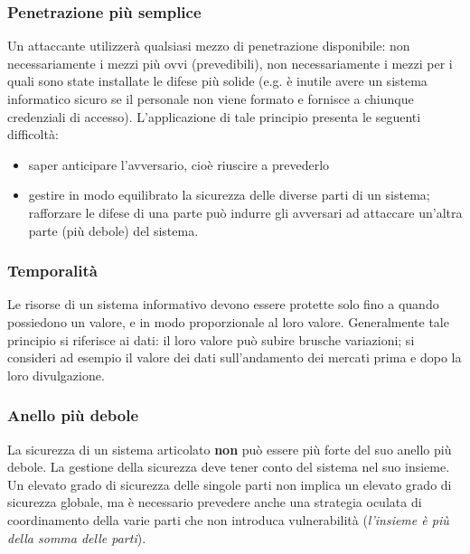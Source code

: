 \subsubsection{Penetrazione più semplice} 
Un attaccante utilizzerà qualsiasi mezzo di penetrazione disponibile: non necessariamente i mezzi più ovvi (prevedibili), non necessariamente i mezzi per i quali sono state installate le difese più solide (e.g. è inutile avere un sistema informatico sicuro se il personale non viene formato e fornisce a chiunque credenziali di accesso). L'applicazione di tale principio presenta le seguenti difficoltà:
\begin{itemize} 
  \item saper anticipare l'avversario, cioè riuscire a prevederlo
  \item gestire in modo equilibrato la sicurezza delle diverse parti di un sistema; rafforzare le difese di una parte può indurre gli avversari ad attaccare un'altra parte (più debole) del sistema.
\end{itemize}

\subsubsection{Temporalità} 
Le risorse di un sistema informativo devono essere protette solo fino a quando possiedono un valore, e in modo proporzionale al loro valore. Generalmente tale principio si riferisce ai dati: il loro valore può subire brusche variazioni; si consideri ad esempio il valore dei dati sull'andamento dei mercati prima e dopo la loro divulgazione.

\subsubsection{Anello più debole}
La sicurezza di un sistema articolato \textbf{non} può essere più forte del suo anello più debole. La gestione della sicurezza deve tener conto del sistema nel suo insieme. Un elevato grado di sicurezza delle singole parti non implica un elevato grado di sicurezza globale, ma è necessario prevedere anche una strategia oculata di coordinamento della varie parti che non introduca vulnerabilità  (\textit{l'insieme è più della somma delle parti}).

